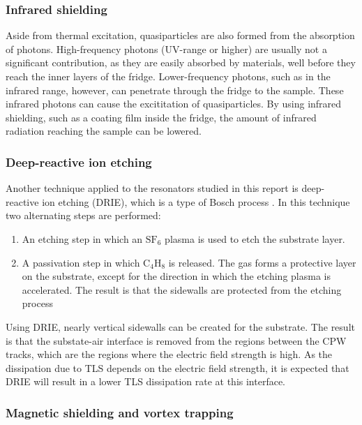 \documentclass[12pt]{report}
\newcommand*\chem[1]{\ensuremath{\mathrm{#1}}}
\begin{document}
\subsubsection{Infrared shielding}

Aside from thermal excitation, quasiparticles are also formed from the absorption of photons. High-frequency photons (UV-range or higher) are usually not a significant contribution, as they are easily absorbed by materials, well before they reach the inner layers of the fridge. Lower-frequency photons, such as in the infrared range, however, can penetrate through the fridge to the sample. These infrared photons can cause the excititation of quasiparticles. By using infrared shielding, such as a coating film inside the fridge, the amount of infrared radiation reaching the sample can be lowered.



\subsubsection{Deep-reactive ion etching}

Another technique applied to the resonators studied in this report is deep-reactive ion etching (DRIE), which is a type of Bosch process \cite{DRIE}. In this technique two alternating steps are performed:

\begin{enumerate}
    \item An etching step in which an $\chem{SF_6}$ plasma is used to etch the substrate layer.
    \item A passivation step in which $\chem{C_4H_8}$ is released. The gas forms a protective layer on the substrate, except for the direction in which the etching plasma is accelerated. The result is that the sidewalls are protected from the etching process
\end{enumerate}

Using DRIE, nearly vertical sidewalls can be created for the substrate. The result is that the substate-air interface is removed from the regions between the CPW tracks, which are the regions where the electric field strength is high. As the dissipation due to TLS depends on the electric field strength, it is expected that DRIE will result in a lower TLS dissipation rate at this interface.

\subsubsection{Magnetic shielding and vortex trapping}
\end{document}
